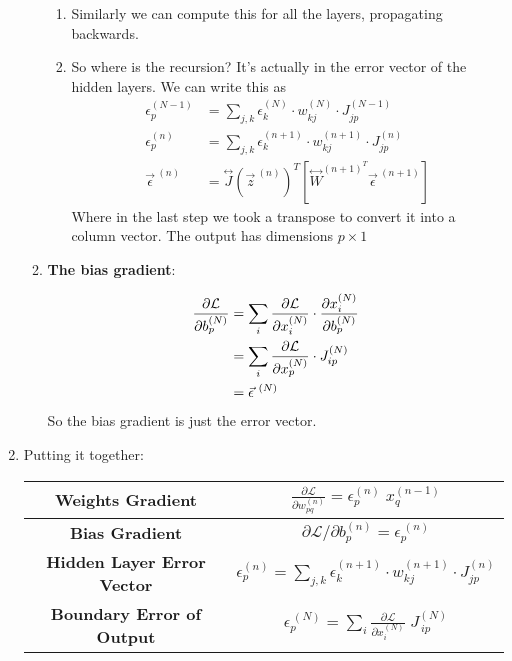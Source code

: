 \documentclass{article}
\begin{document}
\begin{enumerate}
\begin{enumerate}
\begin{enumerate}
         \item Similarly we can compute this for all the layers, propagating backwards. 

        \item So where is the recursion? It's actually in the error vector of the hidden layers. We can write this as
        \begin{align*}
            \epsilon_p^{(N-1)}&=\sum_{j,k}\epsilon_k^{(N)}\cdot w_{kj}^{(N)}\cdot J_{j p}^{(N-1)}\\
            \epsilon_p^{(n)}&=\sum_{j,k}\epsilon_k^{(n+1)}\cdot w_{kj}^{(n+1)}\cdot J_{j p}^{(n)}\\
            \vec{\epsilon}^{\ (n)} &= \overset{\leftrightarrow}{J}\left(\vec{z}^{\ (n)}\right)^T\left[\overset{\leftrightarrow}{W}^{(n+1)^T}\vec{\epsilon}^{\ (n+1)}\right]
        \end{align*}
        Where in the last step we took a transpose to convert it into a column vector. The output has dimensions $p\times 1$
        \end{enumerate}
        
        \item \textbf{The bias gradient}:

        \begin{align*}
            \pdv{\mathcal{L}}{b^{(N)}_{p}} &= \sum_i\pdv{\mathcal{L}}{x_i^{(N)}}\cdot \pdv{x_i^{(N)}}{b_{p}^{(N)}}\\
            &=\sum_i\pdv{\mathcal{L}}{x_p^{(N)}}\cdot J_{ip}^{(N)}\\
            &=\vec{\epsilon}^{\ (N)}
        \end{align*}
         So the bias gradient is just the error vector. 
    \end{enumerate}

\item Putting it together:

    \begin{center}
    \renewcommand{\arraystretch}{3}
    \begin{tabular}{|c|c|}
    \hline
    \textbf{Weights Gradient} & $ \frac{\partial \mathcal{L}}{\partial w_{pq}^{(n)}} = \epsilon_p^{(n)}\;x_q^{(n-1)}$ \\
    \hline
    \textbf{Bias Gradient} & ${\partial\mathcal{L}}/{\partial{b}_p^{(n)}} = {\epsilon}_p^{\ (n)}$ \\
    \hline
    \textbf{Hidden Layer Error Vector} & $\epsilon_p^{(n)}=\sum_{j,k}\epsilon_k^{(n+1)}\cdot w_{kj}^{(n+1)}\cdot J_{j p}^{(n)}$ \\
    \hline
    \textbf{Boundary Error of Output} & ${\epsilon}_p^{\ (N)} = \sum_i\frac{\partial \mathcal{L}}{\partial x_i^{(N)}}\;J_{\,i p}^{(N)}$ \\
    \hline
    \end{tabular}
    \end{center}
    
\end{enumerate}
\end{document}
